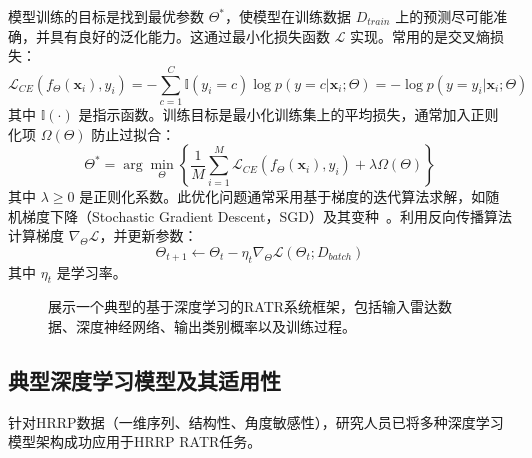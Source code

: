 模型训练的目标是找到最优参数 $\Theta^*$，使模型在训练数据 $D_{train}$ 上的预测尽可能准确，并具有良好的泛化能力。这通过最小化损失函数 $\mathcal{L}$ 实现。常用的是交叉熵损失：
\begin{equation}
    \mathcal{L}_{CE}(f_\Theta(\mathbf{x}_i), y_i) = -\sum_{c=1}^{C} \mathbb{I}(y_i=c) \log p(y=c|\mathbf{x}_i; \Theta) = -\log p(y=y_i|\mathbf{x}_i; \Theta)
    \label{eq:cross_entropy_loss}
\end{equation}
其中 $\mathbb{I}(\cdot)$ 是指示函数。训练目标是最小化训练集上的平均损失，通常加入正则化项 $\Omega(\Theta)$ 防止过拟合：
\begin{equation}
    \Theta^* = \arg\min_{\Theta} \left\{ \frac{1}{M} \sum_{i=1}^{M} \mathcal{L}_{CE}(f_\Theta(\mathbf{x}_i), y_i) + \lambda \Omega(\Theta) \right\}
    \label{eq:optimization_objective}
\end{equation}
其中 $\lambda \ge 0$ 是正则化系数。此优化问题通常采用基于梯度的迭代算法求解，如随机梯度下降（Stochastic Gradient Descent，SGD）及其变种~\cite{X}。利用反向传播算法计算梯度 $\nabla_\Theta \mathcal{L}$，并更新参数：
\begin{equation}
    \Theta_{t+1} \leftarrow \Theta_t - \eta_t \nabla_\Theta \mathcal{L}(\Theta_t; D_{batch})
    \label{eq:sgd_update}
\end{equation}
其中 $\eta_t$ 是学习率。

\begin{figure}[h!]
    \centering
    \caption{展示一个典型的基于深度学习的RATR系统框架，包括输入雷达数据、深度神经网络、输出类别概率以及训练过程。}
    \label{fig:深度学习_framework}
\end{figure}

\subsection{典型深度学习模型及其适用性}
\label{subsec:typical_深度学习_models}

针对HRRP数据（一维序列、结构性、角度敏感性），研究人员已将多种深度学习模型架构成功应用于HRRP RATR任务。

